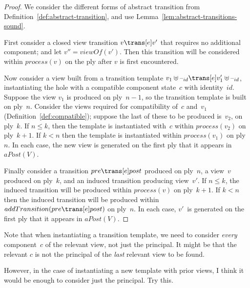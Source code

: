
\begin{proof}
We consider the different forms of abstract transition from
Definition~\ref{def:abstract-transition}, and use
Lemma~\ref{lem:abstract-transitions-sound}. 

First consider a closed view transition $v \trans[e] v'$ that requires no
additional component; and let $v'' = viewOf(v')$.  Then this transition will
be considered within $process(v)$ on the ply after $v$ is first encountered.

Now consider a view built from a transition template $v_1 \uplus \hole{id}
\trans[e] v_1' \uplus \hole{id}$, instantiating the hole with a compatible
component state~$c$ with identity~$id$.  Suppose the view $v_1$ is produced
on ply~$n-1$, so the transition template is built on ply~$n$.  Consider the
views required for compatibility of~$c$ and~$v_1$
(Definition~\ref{def:compatible}); suppose the last of these to be produced
is~$v_2$, on ply~$k$.
If $n \le k$, then the template is instantiated with~$c$ within $process(v_2)$
on ply~$k+1$.  If $k < n$ then the template is instantiated within
$process(v_1)$ on ply~$n$.  In each case, the new view is generated on the
first ply that it appears in $aPost(V)$.

Finally consider a transition $pre \trans[e] post$ produced on ply~$n$, a
view~$v$ produced on ply~$k$, and an induced transition producing view~$v'$.
If $n \le k$, the induced transition will be produced within $process(v)$ on
ply~$k+1$.  If $k < n$ then the induced transition will be produced within
$addTransition(pre \trans[e] post)$ on ply~$n$.  In each case, $v'$~is
generated on the first ply that it appears in $aPost(V)$.
\end{proof}

Note that when instantiating a transition template, we need to
consider \emph{every} component~$c$ of the relevant view, not just the
principal.  It might be that the relevant $c$ is not the principal of the
\emph{last} relevant view to be found.
\begin{improve}
However, in the case of instantiating a new template with prior views, I think
it would be enough to consider just the principal.  Try this.
\end{improve}
